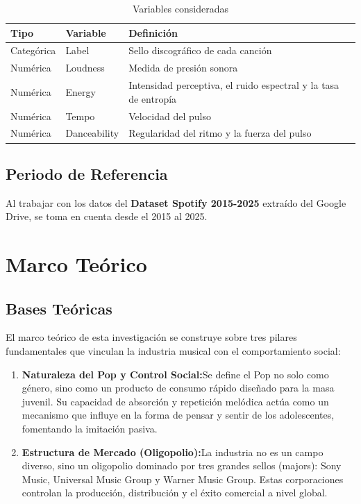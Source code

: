 \documentclass[oneside,11pt]{Latex/Classes/PhDthesisPSnPDF}
\begin{document}
\begin{table}[h!]
\centering
\caption{Variables consideradas} 
\resizebox{12cm}{!} {
\begin{tabular}{llp{9cm}}
  \hline
\textbf{Tipo} &\textbf{Variable} &\textbf{Definición} \\ 
  \hline
  Categórica & Label &  Sello discográfico de cada canción \\
  Numérica  & Loudness &  Medida de presión sonora \\
  Numérica & Energy & Intensidad perceptiva, el ruido espectral y la tasa de entropía \\
  Numérica  & Tempo & Velocidad del pulso \\
  Numérica  & Danceability & Regularidad del ritmo y la fuerza del pulso \\
   \hline
\end{tabular}
}
\end{table}

\section{Periodo de Referencia}

Al trabajar con los datos del \textbf{Dataset Spotify 2015-2025}
extraído del Google Drive, se toma en cuenta desde el 2015 al 2025.

\chapter{Marco Teórico}

\section{Bases Teóricas}

El marco teórico de esta investigación se construye sobre tres pilares
fundamentales que vinculan la industria musical con el comportamiento
social:

\begin{enumerate}
\item \textbf{Naturaleza del Pop y Control Social:}Se define el Pop no solo como género, sino como un producto de consumo rápido diseñado para la masa juvenil. Su capacidad de absorción y repetición melódica actúa como un mecanismo que influye en la forma de pensar y sentir de los adolescentes, fomentando la imitación pasiva.
  
  \item \textbf{Estructura de Mercado (Oligopolio):}La industria no es un campo diverso, sino un oligopolio dominado por tres grandes sellos (majors): Sony Music, Universal Music Group y Warner Music Group. Estas corporaciones controlan la producción, distribución y el éxito comercial a nivel global. 
   
 \end{enumerate}
\end{document}
